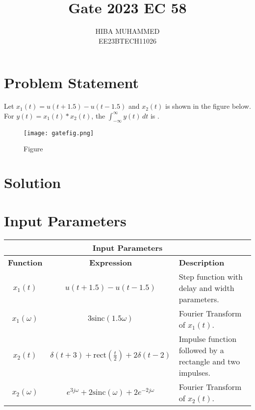 \documentclass[journal,12pt,twocolumn]{IEEEtran}
\theoremstyle{remark}
\begin{document}

\title{Gate 2023 EC 58}
\author{HIBA MUHAMMED\\
        EE23BTECH11026}
\maketitle

\section*{Problem Statement}
Let $x_1(t) = u(t + 1.5) - u(t - 1.5)$ and $x_2(t)$ is shown in the figure below. For $y(t) = x_1(t) * x_2(t)$, the $\int_{-\infty}^{\infty} y(t) \, dt$ is \underline{\hspace{2cm}}.

\begin{figure}[htbp]
    \centering
    \texttt{[image: gatefig.png]}
    \caption{Figure}
    \label{fig:graph}
\end{figure}

\section*{Solution}
\section*{Input Parameters}
\begin{table}[htbp]
    \centering
    \begin{tabular}{|c|c|p{6cm}|}
        \hline
        \multicolumn{3}{|c|}{\textbf{Input Parameters}} \\
        \hline
        \textbf{Function} & \textbf{Expression} & \textbf{Description} \\
        \hline
        $x_1(t)$ & $u(t + 1.5) - u(t - 1.5)$ & Step function with delay and width parameters. \\
        $x_1(\omega)$ & $3\text{sinc}(1.5\omega)$ & Fourier Transform of $x_1(t)$. \\
        $x_2(t)$ & $\delta(t + 3) + \text{rect}\left(\frac{t}{2}\right) + 2\delta(t - 2)$ & Impulse function followed by a rectangle and two impulses. \\
        $x_2(\omega)$ & $e^{3j\omega} + 2\text{sinc}(\omega) + 2e^{-2j\omega}$ & Fourier Transform of $x_2(t)$. \\
        \hline
    \end{tabular}
\end{table}
\end{document}
